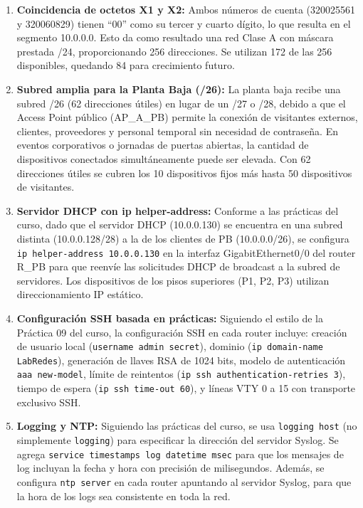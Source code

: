 \documentclass[letterpaper,11pt]{article}
\begin{document}
\begin{enumerate}
    \item \textbf{Coincidencia de octetos X1 y X2:} Ambos números de cuenta (320025561 y 320060829) tienen ``00'' como su tercer y cuarto dígito, lo que resulta en el segmento 10.0.0.0. Esto da como resultado una red Clase A con máscara prestada /24, proporcionando 256 direcciones. Se utilizan 172 de las 256 disponibles, quedando 84 para crecimiento futuro.

    \item \textbf{Subred amplia para la Planta Baja (/26):} La planta baja recibe una subred /26 (62 direcciones útiles) en lugar de un /27 o /28, debido a que el Access Point público (AP\_A\_PB) permite la conexión de visitantes externos, clientes, proveedores y personal temporal sin necesidad de contraseña. En eventos corporativos o jornadas de puertas abiertas, la cantidad de dispositivos conectados simultáneamente puede ser elevada. Con 62 direcciones útiles se cubren los 10 dispositivos fijos más hasta 50 dispositivos de visitantes.

    \item \textbf{Servidor DHCP con ip helper-address:} Conforme a las prácticas del curso, dado que el servidor DHCP (10.0.0.130) se encuentra en una subred distinta (10.0.0.128/28) a la de los clientes de PB (10.0.0.0/26), se configura \texttt{ip helper-address 10.0.0.130} en la interfaz GigabitEthernet0/0 del router R\_PB para que reenvíe las solicitudes DHCP de broadcast a la subred de servidores. Los dispositivos de los pisos superiores (P1, P2, P3) utilizan direccionamiento IP estático.

    \item \textbf{Configuración SSH basada en prácticas:} Siguiendo el estilo de la Práctica 09 del curso, la configuración SSH en cada router incluye: creación de usuario local (\texttt{username admin secret}), dominio (\texttt{ip domain-name LabRedes}), generación de llaves RSA de 1024 bits, modelo de autenticación \texttt{aaa new-model}, límite de reintentos (\texttt{ip ssh authentication-retries 3}), tiempo de espera (\texttt{ip ssh time-out 60}), y líneas VTY 0 a 15 con transporte exclusivo SSH.

    \item \textbf{Logging y NTP:} Siguiendo las prácticas del curso, se usa \texttt{logging host} (no simplemente \texttt{logging}) para especificar la dirección del servidor Syslog. Se agrega \texttt{service timestamps log datetime msec} para que los mensajes de log incluyan la fecha y hora con precisión de milisegundos. Además, se configura \texttt{ntp server} en cada router apuntando al servidor Syslog, para que la hora de los logs sea consistente en toda la red.


\end{enumerate}
\end{document}
